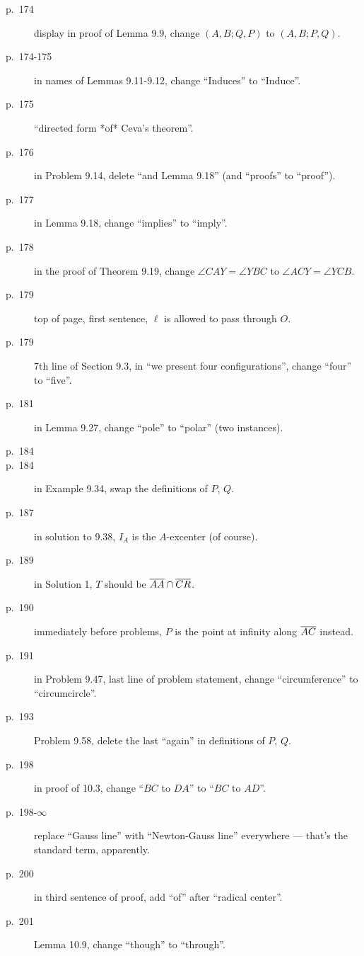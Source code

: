 \documentclass[11pt]{scrartcl}
\begin{document}
\begin{description}
\item[p.\  174] display in proof of Lemma 9.9, change $(A,B;Q,P)$ to $(A,B;P,Q)$.
\item[p.\  174-175] in names of Lemmas 9.11-9.12,
  change ``Induces'' to ``Induce''.
\item[p.\  175] ``directed form *of* Ceva's theorem''.
\item[p.\  176] in Problem 9.14, delete ``and Lemma 9.18'' (and ``proofs'' to ``proof'').
\item[p.\  177] in Lemma 9.18, change ``implies'' to ``imply''.
\item[p.\  178] in the proof of Theorem 9.19, change $\angle CAY = \angle YBC$ to $\angle ACY = \angle YCB$.
\item[p.\  179] top of page, first sentence, $\ell$ is allowed to pass through $O$.
\item[p.\  179] 7th line of Section 9.3, in ``we present four configurations'',
  change ``four'' to ``five''.
\item[p.\  181] in Lemma 9.27, change ``pole'' to ``polar'' (two instances).
\item[p.\  184] 
\item[p.\  184] in Example 9.34, swap the definitions of $P$, $Q$.
\item[p.\  187] in solution to 9.38, $I_A$ is the $A$-excenter (of course).
\item[p.\  189] in Solution 1, $T$ should be $\overline{AA} \cap \overline{CR}$.
\item[p.\  190] immediately before problems, $P$ is the point at infinity along $\overline{AC}$ instead.
\item[p.\  191] in Problem 9.47, last line of problem statement,
  change ``circumference'' to ``circumcircle''.
\item[p.\  193] Problem 9.58, delete the last ``again'' in definitions of $P$, $Q$.
\item[p.\  198] in proof of 10.3, change ``$BC$ to $DA$'' to ``$BC$ to $AD$''.
\item[p.\  198-$\infty$] replace ``Gauss line'' with ``Newton-Gauss line''
  everywhere --- that's the standard term, apparently.
\item[p.\  200] in third sentence of proof, add ``of'' after ``radical center''.
\item[p.\  201] Lemma 10.9, change ``though'' to ``through''.

\end{description}
\end{document}
